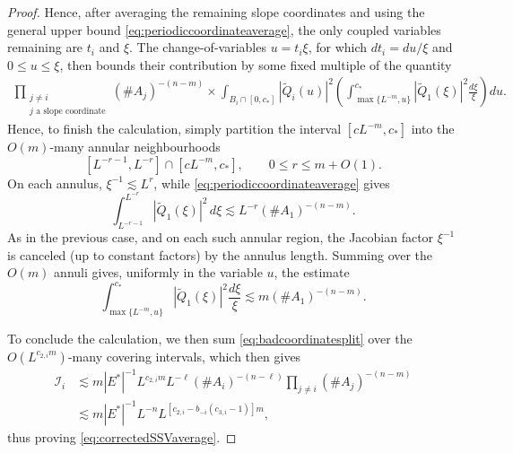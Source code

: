 \documentclass[12pt]{amsart}
\numberwithin{equation}{section}
\renewcommand{\j}[1]{\langle #1 \rangle}
\begin{document}
\begin{proof}
Hence, after averaging the remaining slope coordinates and using the general upper bound \eqref{eq:periodiccoordinateaverage}, the only coupled variables remaining are $t_i$ and $\xi$.  The change-of-variables $u=t_i\xi$, for which $dt_i=du/\xi$ and $0\leq u\leq\xi$, then bounds their contribution by some fixed multiple of the quantity
\begin{align*}
\prod_{\substack{j\neq i\\j\text{ a slope coordinate}}}
 (\#A_j)^{-(n-m)}                  \times
 \int_{B_i\cap[0,c_*]}|\widetilde Q_i(u)|^2
 \left(\int_{\max\{L^{-m},u\}}^{c_*}
 |\widetilde Q_1(\xi)|^2\frac{d\xi}{\xi}\right)du.
 \end{align*}
Hence, to finish the calculation, simply partition the interval $[cL^{-m},c_*]$ into the $O(m)$-many annular neighbourhoods
\[
 [L^{-r-1},L^{-r}]\cap[cL^{-m},c_*],
 \qquad 0\leq r\leq m+O(1).
\]
On each annulus, $\xi^{-1}\lesssim L^r$, while
\eqref{eq:periodiccoordinateaverage} gives
\[
 \int_{L^{-r-1}}^{L^{-r}}|\widetilde Q_1(\xi)|^2\,d\xi
 \lesssim L^{-r}(\#A_1)^{-(n-m)}.
\]
As in the previous case, and on each such annular region, the Jacobian factor $\xi^{-1}$ is  canceled (up to constant factors) by the annulus length.  Summing over the $O(m)$ annuli gives, uniformly in the variable $u$, the estimate
\begin{equation}\label{eq:logarithmic-coordinate-average}
 \int_{\max\{L^{-m},u\}}^{c_*}
 |\widetilde Q_1(\xi)|^2\frac{d\xi}{\xi}
 \lesssim m(\#A_1)^{-(n-m)}.
\end{equation}

To conclude the calculation, we then sum
\eqref{eq:badcoordinatesplit} over the $O(L^{c_{2,i}m})$-many covering intervals, which then gives
\begin{align*}
 \mathcal I_i
 &\lesssim m|E^*|^{-1}L^{c_{2,i}m}L^{-\ell}
 (\#A_i)^{-(n-\ell)}
 \prod_{j\neq i}(\#A_j)^{-(n-m)}\\
 &\lesssim m|E^*|^{-1}L^{-n}
 L^{[c_{2,i}-b_{-i}(c_{3,i}-1)]m},
\end{align*}
thus proving \eqref{eq:correctedSSVaverage}.
\end{proof}
\end{document}
